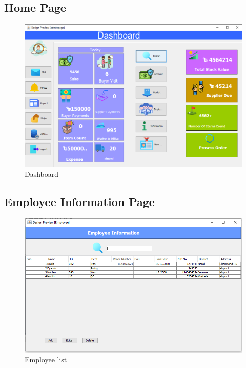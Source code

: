 \documentclass{article}
\begin{document}
\subsection{Home Page}
\begin{figure}[h]
    \centering
    \includegraphics[width=15 cm]{ui/dashboard.png}
    \caption{Dashboard}
    \label{fig:my_label}
\end{figure}
\newpage
\subsection{Employee Information Page}
\begin{figure}[h]
    \centering
    \includegraphics[width= 13 cm]{ui/employeerInfor.png}
    \caption{Employee list}
    \label{fig:my_label}
\end{figure}
\newpage
\end{document}
